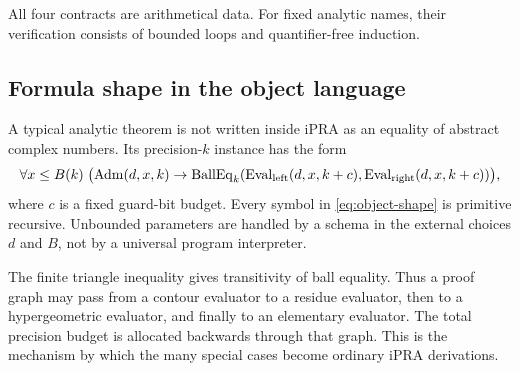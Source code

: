 All four contracts are arithmetical data.  For fixed analytic names, their
verification consists of bounded loops and quantifier-free induction.

\subsection{Formula shape in the object language}

A typical analytic theorem is not written inside iPRA as an equality of
abstract complex numbers.  Its precision-$k$ instance has the form
\begin{equation}\label{eq:object-shape}
 \forall x\le B(k)\;
   \bigl(\operatorname{Adm}(d,x,k)\to
   \operatorname{BallEq}_k(\operatorname{Eval}_{\rm left}(d,x,k+c),
             \operatorname{Eval}_{\rm right}(d,x,k+c))\bigr),
\end{equation}
where $c$ is a fixed guard-bit budget.  Every symbol in
\eqref{eq:object-shape} is primitive recursive.  Unbounded parameters are
handled by a schema in the external choices $d$ and $B$, not by a universal
program interpreter.

The finite triangle inequality gives transitivity of ball equality.  Thus a
proof graph may pass from a contour evaluator to a residue evaluator, then to a
hypergeometric evaluator, and finally to an elementary evaluator.  The total
precision budget is allocated backwards through that graph.  This is the
mechanism by which the many special cases become ordinary iPRA derivations.
